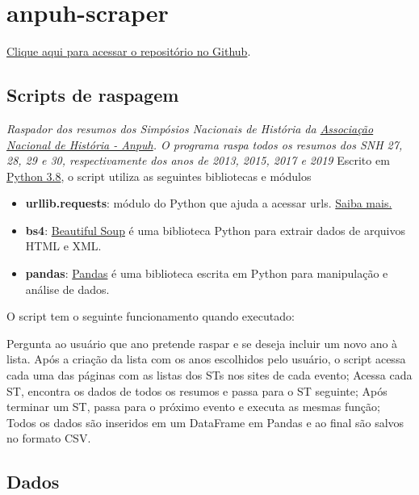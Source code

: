 \documentclass[
]{book}
\providecommand{\tightlist}{%
  \setlength{\itemsep}{0pt}\setlength{\parskip}{0pt}}
\begin{document}
\hypertarget{anpuh-scraper}{%
\section{anpuh-scraper}\label{anpuh-scraper}}

\href{https://github.com/LABHDUFBA/anpuh-scraper}{Clique aqui para acessar o repositório no Github}.

\hypertarget{scripts-de-raspagem-1}{%
\subsection{Scripts de raspagem}\label{scripts-de-raspagem-1}}

\emph{Raspador dos resumos dos Simpósios Nacionais de História da \href{https://anpuh.org.br}{Associação Nacional de História - Anpuh}. O programa raspa todos os resumos dos SNH 27, 28, 29 e 30, respectivamente dos anos de 2013, 2015, 2017 e 2019}
Escrito em \href{https://www.python.org/}{Python 3.8}, o script utiliza as seguintes bibliotecas e módulos

\begin{itemize}
\tightlist
\item
  \textbf{urllib.requests}: módulo do Python que ajuda a acessar urls.
  \href{https://docs.python.org/pt-br/3/library/urllib.request.htmll}{Saiba mais.}
\item
  \textbf{bs4}: \href{https://www.crummy.com/software/BeautifulSoup/bs4/doc/}{Beautiful Soup} é uma biblioteca Python para extrair dados de arquivos HTML e XML.
\item
  \textbf{pandas}: \href{https://pandas.pydata.org/}{Pandas} é uma biblioteca escrita em Python para manipulação e análise de dados.
\end{itemize}

O script tem o seguinte funcionamento quando executado:

Pergunta ao usuário que ano pretende raspar e se deseja incluir um novo ano à lista.
Após a criação da lista com os anos escolhidos pelo usuário, o script acessa cada uma das páginas com as listas dos STs nos sites de cada evento;
Acessa cada ST, encontra os dados de todos os resumos e passa para o ST seguinte;
Após terminar um ST, passa para o próximo evento e executa as mesmas função;
Todos os dados são inseridos em um DataFrame em Pandas e ao final são salvos no formato CSV.

\hypertarget{dados-1}{%
\subsection{Dados}\label{dados-1}}
\end{document}
